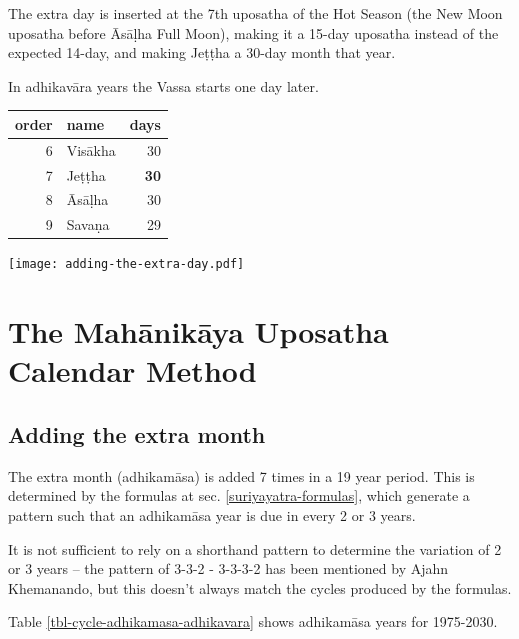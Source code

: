 \documentclass[11pt,oneside]{memoir-article}
\begin{document}
The extra day is inserted at the 7th uposatha of the Hot Season (the New Moon
uposatha before Āsāḷha Full Moon), making it a 15-day uposatha instead of the
expected 14-day, and making Jeṭṭha a 30-day month that
year.\autocite{hasapannyo-zodiac}

In adhikavāra years the Vassa starts one day later.

\begin{center}
\begin{tabular}{rlr}
order & name & days\\
\hline
6 & Visākha & 30\\
7 & Jeṭṭha & \textbf{30}\\
8 & Āsāḷha & 30\\
9 & Savaṇa & 29\\
\end{tabular}
\end{center}

\texttt{[image: adding-the-extra-day.pdf]}

\label{uposatha-tutorial-end}

\clearpage

\chapter{The Mahānikāya Uposatha Calendar Method}
\label{sec-2}
\section{Adding the extra month}
\label{sec-2-1}

The extra month (adhikamāsa) is added 7 times in a 19 year period. This is
determined by the formulas at sec. \ref{suriyayatra-formulas}, which generate a pattern
such that an adhikamāsa year is due in every 2 or 3 years.

It is not sufficient to rely on a shorthand pattern to determine the variation
of 2 or 3 years -- the pattern of 3-3-2 - 3-3-3-2 has been mentioned by Ajahn
Khemanando\autocite{khemanando-adhikamasa}, but this doesn't always match the cycles
produced by the formulas.

Table \ref{tbl-cycle-adhikamasa-adhikavara} shows adhikamāsa years for 1975-2030.

\end{document}
